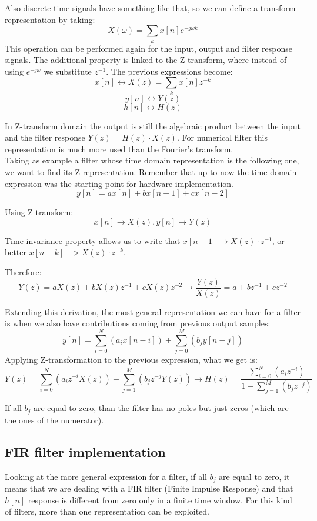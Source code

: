 Also discrete time signals have something like that, so we can define a transform representation by taking:
$$X(\omega)= \sum_k x[n] e^{-j \omega k}$$
This operation can be performed again for the input, output and filter response signals.
The additional property is linked to the Z-transform, where instead of using $e^{-j \omega}$ we substitute $z^{-1}$. The previous expressions become:
$$x[n] \leftrightarrow X(z)=\sum_k x[n] z^{-k}$$
$$y[n] \leftrightarrow Y(z)$$
$$h[n] \leftrightarrow H(z)$$

In Z-transform domain the output is still the algebraic product between the input and the filter response $Y(z)=H(z) \cdot X(z)$. For numerical filter this representation is much more used than the Fourier's transform. \\

Taking as example a filter whose time domain representation is the following one, we want to find its Z-representation. Remember that up to now the time domain expression was the starting point for hardware implementation.
$$y[n]=ax[n] + bx[n-1] + cx[n-2]$$

Using Z-transform:
$$x[n] \rightarrow X(z), y[n] \rightarrow Y(z)$$

Time-invariance property allows us to write that $x[n-1] \rightarrow X(z) \cdot z^{-1}$, or better $x[n-k] -> X(z) \cdot z^{-k}$.

Therefore:
$$Y(z)= aX(z) + bX(z) z^{-1} + c X(z) z^{-2}  \rightarrow \frac{Y(z)}{X(z)} = a+ bz^{-1}+ cz^{-2}$$

Extending this derivation, the most general representation we can have for a filter is when we also have contributions coming from previous output samples:
$$y[n]=\sum_{i=0}^{N} (a_i x[n-i]) + \sum_{j=0}^{M} (b_j y[n-j])$$
Applying Z-transformation to the previous expression, what we get is:
$$Y(z)=\sum_{i=0}^{N}(a_i z^{-i}X(z)) + \sum_{j=1}^{M}(b_j z^{-j} Y(z)) \rightarrow H(z)=\frac{\sum_{i=0}^{N}(a_i z^{-i})}{1-\sum_{j=1}^{M}(b_j z^{-j})} $$

If all $b_j$ are equal to zero, than the filter has no poles but just zeros (which are the ones of the numerator).

\subsection{FIR filter implementation}
Looking at the more general expression for a filter, if all $b_j$ are equal to zero, it means that we are dealing with a FIR filter (Finite Impulse Response) and that $h[n]$ response is different from zero only in a finite time window. For this kind of filters, more than one representation can be exploited.

